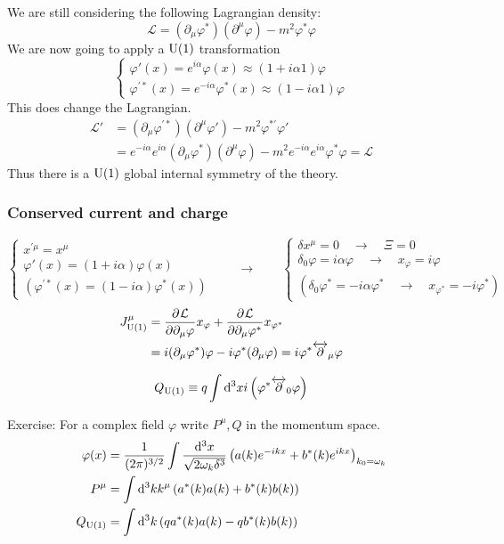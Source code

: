 We are still considering the following Lagrangian density: 
\[ \mathcal{L} = (\partial_\mu\varphi^*)(\partial^\mu\varphi) - m^2\varphi^*\varphi \]
We are now going to apply a $\operatorname{U}(1)$ transformation
\[ \begin{cases}
\varphi'(x) = e^{i\alpha}\varphi(x) \approx (1+i\alpha 1)\varphi \\
\varphi^{\prime*}(x) = e^{-i\alpha}\varphi^*(x) \approx (1-i\alpha 1)\varphi
\end{cases} \]
This does change the Lagrangian.
\begin{align*}
\mathcal{L}' &= (\partial_\mu\varphi^{\prime*})(\partial^\mu\varphi') - m^2\varphi^{*\prime}\varphi' \\
&= e^{-i\alpha}e^{i\alpha}(\partial_\mu\varphi^*)(\partial^\mu\varphi) - m^2e^{-i\alpha}e^{i\alpha}\varphi^*\varphi = \mathcal{L}
\end{align*}
Thus there is a $\operatorname{U}(1)$ global internal symmetry of the theory.
\subsubsection{Conserved current and charge}
\[ \begin{cases}
x^{\prime\mu} = x^\mu \\ \varphi'(x) = (1+i\alpha)\varphi(x) \\ \left(\varphi^{\prime*}(x) = (1-i\alpha)\varphi^*(x)\right)
\end{cases} \qquad \to \qquad \begin{cases}
\delta x^\mu = 0 \quad \to \quad \Xi = 0 \\ \delta_0\varphi = i\alpha\varphi \quad \to \quad x_\varphi = i\varphi \\ \left(\delta_0\varphi^* = -i\alpha\varphi^* \quad \to \quad x_{\varphi^*} = -i\varphi^*\right)
\end{cases} \]
\begin{align*}
J^\mu_{\operatorname{U}(1)} &=  \frac{\partial{^{}}\mathcal{L}}{\partial{{\partial_\mu\varphi}^{}}} x_\varphi +  \frac{\partial{^{}}\mathcal{L}}{\partial{{\partial_\mu\varphi^*}^{}}} x_{\varphi^*} \\
&= i(\partial_\mu\varphi^*)\varphi - i\varphi^*(\partial_\mu\varphi) = i\varphi^*\overleftrightarrow{\partial}_\mu\varphi
\end{align*}

\[ Q_{\operatorname{U}(1)} \equiv q \int \operatorname{d \!}{^3x}i \left(\varphi^*\overleftrightarrow{\partial}_0\varphi\right) \]

\begin{example}
Exercise: For a complex field $\varphi$ write $P^\mu, Q$ in the momentum space.
\begin{align*}
\varphi(x) &= \frac{1}{(2\pi)^{3/2}}\int \frac{\operatorname{d \!}{^3x}}{\sqrt{2\omega_k\delta^3}}\left(a(k)e^{-ikx}+b^*(k)e^{ikx}\right)_{k_0=\omega_k} \\
P^\mu &= \int \operatorname{d \!}{^3k}k^\mu \left(a^*(k)a(k) + b^*(k)b(k)\right) \\
Q_{\operatorname{U}(1)} &= \int \operatorname{d \!}{^3k}\left(qa^*(k)a(k) - qb^*(k)b(k)\right)
\end{align*}
\end{example}





